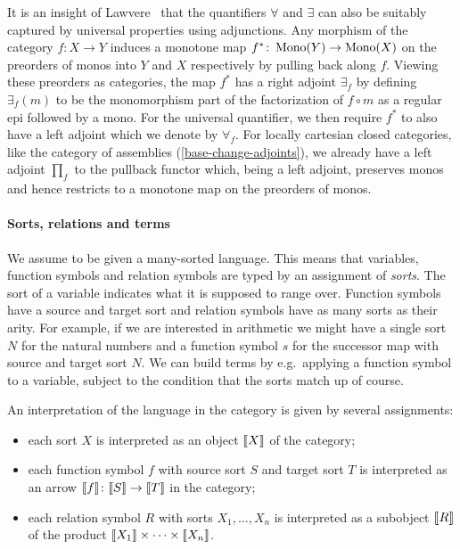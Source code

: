 It is an insight of Lawvere~\cite{Lawvere1969} that the quantifiers \(\forall\)
and \(\exists\) can also be suitably captured by universal properties using
adjunctions.
%
Any morphism of the category \(f \colon X \to Y\) induces a monotone map
\(f^\ast \colon \operatorname{Mono}(Y) \to \operatorname{Mono}(X)\) on the preorders of monos into \(Y\) and
\(X\) respectively by pulling back along \(f\).
%
Viewing these preorders as categories, the map \(f^\ast\) has a right adjoint
\(\exists_f\) by defining \(\exists_f(m)\) to be the monomorphism part of the
factorization of \(f \circ m\) as a regular epi followed by a mono.
%
For the universal quantifier, we then require \(f^\ast\) to also have a left
adjoint which we denote by \(\forall_f\).
%
For locally cartesian closed categories, like the category of assemblies
(\cref{base-change-adjoints}), we already have a left adjoint \(\prod_f\) to the
pullback functor which, being a left adjoint, preserves monos and hence
restricts to a monotone map on the preorders of monos.

\paragraph{Sorts, relations and terms}
We assume to be given a many-sorted language. This means that variables,
function symbols and relation symbols are typed by an assignment of
\emph{sorts}.
%
The sort of a variable indicates what it is supposed to range over.
%
Function symbols have a source and target sort and relation symbols have as many
sorts as their arity.
%
For example, if we are interested in arithmetic we might have a single sort
\(N\) for the natural numbers and a function symbol \(s\) for the successor map
with source and target sort \(N\).
%
We can build terms by e.g.\ applying a function symbol to a variable, subject to
the condition that the sorts match up of course.

An interpretation of the language in the category is given by several assignments:
\begin{itemize}
\item each sort \(X\) is interpreted as an object \(\llbracket X\rrbracket\) of the category;
\item each function symbol \(f\) with source sort \(S\) and target sort \(T\) is
  interpreted as an arrow \(\llbracket f\rrbracket \colon \llbracket S\rrbracket \to \llbracket T\rrbracket\) in the
  category;
\item each relation symbol \(R\) with sorts \(X_1,\dots,X_n\) is interpreted as
  a subobject \(\llbracket R\rrbracket\) of the product
  \(\llbracket X_1\rrbracket\times\cdots\times\llbracket X_n\rrbracket\).
\end{itemize}

